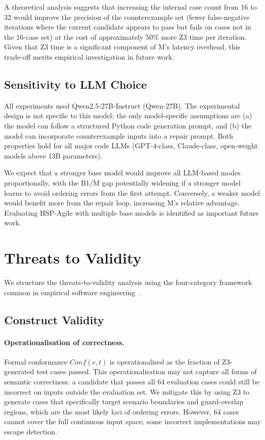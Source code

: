 A theoretical analysis suggests that increasing the internal case count from 16 to 32
would improve the precision of the counterexample set (fewer false-negative iterations
where the current candidate appears to pass but fails on cases not in the 16-case
set) at the cost of approximately 50\% more Z3 time per iteration.  Given that Z3
time is a significant component of M's latency overhead, this trade-off merits
empirical investigation in future work.

\subsection{Sensitivity to LLM Choice}

All experiments used Qwen2.5-27B-Instruct (\textsf{Qwen-27B}).  The experimental design is
not specific to this model; the only model-specific assumptions are (a) the model can
follow a structured Python code generation prompt, and (b) the model can incorporate
counterexample inputs into a repair prompt.  Both properties hold for all major code
LLMs (GPT-4-class, Claude-class, open-weight models above 13B parameters).

We expect that a stronger base model would improve all LLM-based modes proportionally,
with the B1/M gap potentially widening if a stronger model learns to avoid ordering
errors from the first attempt.  Conversely, a weaker model would benefit more from
the repair loop, increasing M's relative advantage.  Evaluating HSP-Agile with
multiple base models is identified as important future work.

\section{Threats to Validity}
\label{sec:exp:threats}

We structure the threats-to-validity analysis using the four-category framework
common in empirical software engineering~\citep{ammann2016testing,woodcock2009formalsurvey}.

\subsection{Construct Validity}

\paragraph{Operationalisation of correctness.}
Formal conformance $\mathit{Conf}(c,t)$ is operationalised as the fraction of
Z3-generated test cases passed.  This operationalisation may not capture all forms
of semantic correctness: a candidate that passes all 64 evaluation cases could still
be incorrect on inputs outside the evaluation set.  We mitigate this by using Z3 to
generate cases that specifically target scenario boundaries and guard-overlap regions,
which are the most likely loci of ordering errors.  However, 64 cases cannot cover
the full continuous input space; some incorrect implementations may escape detection.

